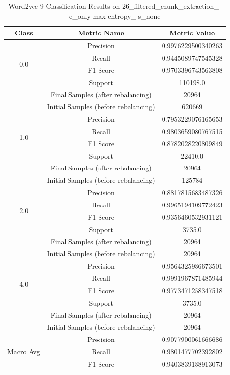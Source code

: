 \begin{longtable}{|c|c|c|}
\caption{Word2vec 9 Classification Results on 26\_filtered\_chunk\_extraction\_-e\_only-max-entropy\_-s\_none} \label{tab:26_filtered_chunk_extraction_-e_only-max-entropy_-s_none_word2vec_9_classifiers_results} \\
\hline
Class & Metric Name & Metric Value \\
\hline
\multirow{4}{*}{0.0} & Precision & 0.9976229500340263 \\
 & Recall & 0.9445089747545328 \\
 & F1 Score & 0.9703396743563808 \\
 & Support & 110198.0 \\
 & Final Samples (after rebalancing) & 20964 \\
 & Initial Samples (before rebalancing) & 620669 \\
\hline
\multirow{4}{*}{1.0} & Precision & 0.7953229076165653 \\
 & Recall & 0.9803659080767515 \\
 & F1 Score & 0.8782028220809849 \\
 & Support & 22410.0 \\
 & Final Samples (after rebalancing) & 20964 \\
 & Initial Samples (before rebalancing) & 125784 \\
\hline
\multirow{4}{*}{2.0} & Precision & 0.8817815683487326 \\
 & Recall & 0.9965194109772423 \\
 & F1 Score & 0.9356460532931121 \\
 & Support & 3735.0 \\
 & Final Samples (after rebalancing) & 20964 \\
 & Initial Samples (before rebalancing) & 20964 \\
\hline
\multirow{4}{*}{4.0} & Precision & 0.9564325986673501 \\
 & Recall & 0.9991967871485944 \\
 & F1 Score & 0.9773471258347518 \\
 & Support & 3735.0 \\
 & Final Samples (after rebalancing) & 20964 \\
 & Initial Samples (before rebalancing) & 20964 \\
\hline
\multirow{4}{*}{Macro Avg} & Precision & 0.9077900061666686 \\
 & Recall & 0.9801477702392802 \\
 & F1 Score & 0.9403839188913073 \\

\end{longtable}
